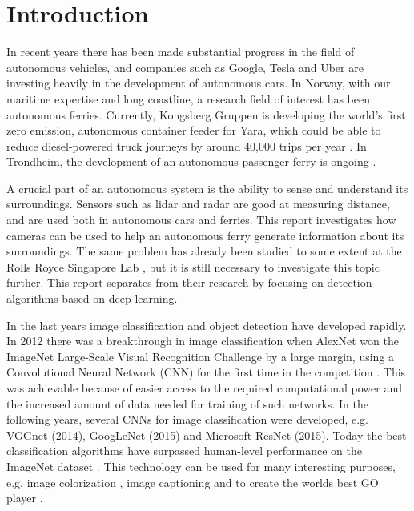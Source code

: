 
\chapter{Introduction}

In recent years there has been made substantial progress in the field of autonomous vehicles, and companies such as Google, Tesla and Uber are investing heavily in the development of autonomous cars. In Norway, with our maritime expertise and long coastline, a research field of interest has been autonomous ferries. Currently, Kongsberg Gruppen is developing the world's first zero emission, autonomous container feeder for Yara, which could be able to reduce diesel-powered truck journeys by around 40,000 trips per year \citep{yara}. In Trondheim, the development of an autonomous passenger ferry is ongoing \citep{autonom_trd}. 

\vspace{3mm}

\noindent
A crucial part of an autonomous system is the ability to sense and understand its surroundings. Sensors such as lidar and radar are good at measuring distance, and are used both in autonomous cars and ferries. This report investigates how cameras can be used to help an autonomous ferry generate information about its surroundings. The same problem has already been studied to some extent at the Rolls Royce Singapore Lab \citep{Prasad2016} \citep{Prasad2016a}, but it is still necessary to investigate this topic further. This report separates from their research by focusing on detection algorithms based on deep learning. 

\vspace{3mm}

\noindent
In the last years image classification and object detection have developed rapidly. In 2012 there was a breakthrough in image classification when AlexNet won the ImageNet Large-Scale Visual Recognition Challenge by a large margin, using a Convolutional Neural Network (CNN) for the first time in the competition \citep{Krizhevsky2012}. This was achievable because of easier access to the required computational power and the increased amount of data needed for training of such networks. In the following years, several CNNs for image classification were developed, e.g. VGGnet (2014), GoogLeNet (2015) and Microsoft ResNet (2015). Today the best classification algorithms have surpassed human-level performance on the ImageNet dataset \citep{He}. This technology can be used for many interesting purposes, e.g. image colorization \citep{Zhang2016}, image captioning \citep{Karpathy2016} and to create the worlds best GO player \citep{Silver2016}.

